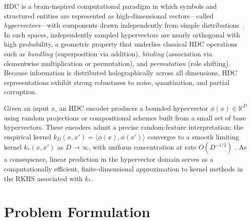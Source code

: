 \documentclass[sigconf,anonymous]{aamas}
\theoremstyle{plain}
\theoremstyle{definition}
\theoremstyle{remark}
\begin{document}
\label{subsec:hdc_background}

HDC is a brain-inspired computational paradigm in which symbols and structured entities are represented as high-dimensional vectors---called \emph{hypervectors}---with components drawn independently from simple distributions~\citep{kanerva2009hyperdimensional}. In such spaces, independently sampled hypervectors are nearly orthogonal with high probability, a geometric property that underlies classical HDC operations such as \emph{bundling} (superposition via addition), \emph{binding} (association via elementwise multiplication or permutation), and \emph{permutation} (role shifting). Because information is distributed holographically across all dimensions, HDC representations exhibit strong robustness to noise, quantization, and partial corruption.

Given an input $x$, an HDC encoder produces a bounded hypervector $\phi(x)\in\mathbb{K}^D$ using random projections or compositional schemes built from a small set of base hypervectors. These encoders admit a precise random-feature interpretation: the empirical kernel $k_D(x,x')=\langle \phi(x),\phi(x')\rangle$
converges to a smooth limiting kernel $k_\ast(x,x')$ as $D\to\infty$, with uniform concentration at rate $O(D^{-1/2})$ \citep{rahimi2007random,bach2015equivalence,rudi2017generalization}. As a consequence, linear prediction in the hypervector domain serves as a computationally efficient, finite-dimensional approximation to kernel methods in the RKHS associated with $k_\ast$.



\section{Problem Formulation}
\label{sec:problem}
\end{document}
